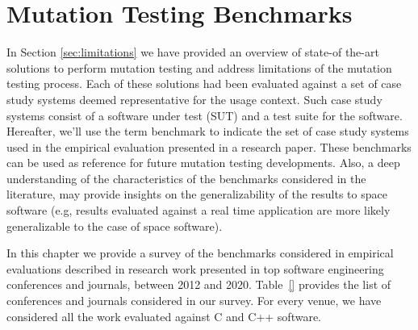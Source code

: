
\chapter{Mutation Testing Benchmarks}
\label{chapter:industry}



%

In Section \ref{sec:limitations} we have provided an overview of state-of the-art solutions to perform mutation testing and address limitations of the mutation testing process.
Each of these solutions had been evaluated against a set of case study systems deemed representative for the usage context. Such case study systems consist of a software under test (SUT) and a test suite for the software.
Hereafter, we'll use the term benchmark to indicate the set of case study systems used in the empirical evaluation presented in a research paper.
These benchmarks can be used as reference for future mutation testing developments. 
Also, a deep understanding of the characteristics of the benchmarks considered in the literature, may provide insights on the generalizability of the results to space software (e.g, results evaluated against a real time application are more likely generalizable to the case of space software).


In this chapter we provide a survey of the benchmarks considered in empirical evaluations described in research work presented in top software engineering conferences and journals, between 2012 and 2020. Table~\ref{} provides the list of conferences and journals considered in our survey. For every venue, we have considered all the work evaluated against C and C++ software.

